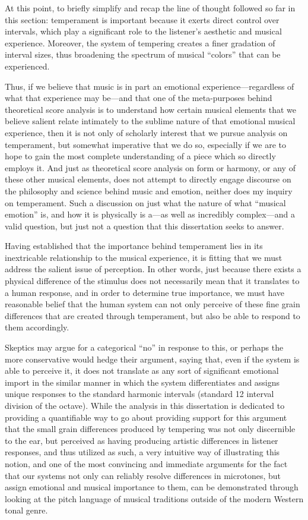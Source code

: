 At this point, to briefly simplify and recap the line of thought
followed so far in this section: temperament is important because it
exerts direct control over intervals, which play a significant role to
the listener's aesthetic and musical experience. Moreover, the system of
tempering creates a finer gradation of interval sizes, thus broadening
the spectrum of musical ``colors'' that can be experienced.

Thus, if we believe that music is in part an emotional
experience---regardless of what that experience may be---and that one of
the meta-purposes behind theoretical score analysis is to understand how
certain musical elements that we believe salient relate intimately to
the sublime nature of that emotional musical experience, then it is not
only of scholarly interest that we pursue analysis on temperament, but
somewhat imperative that we do so, especially if we are to hope to gain
the most complete understanding of a piece which so directly employs it.
And just as theoretical score analysis on form or harmony, or any of
these other musical elements, does not attempt to directly engage
discourse on the philosophy and science behind music and emotion,
neither does my inquiry on temperament. Such a discussion on just what
the nature of what ``musical emotion'' is, and how it is physically is
a---as well as incredibly complex---and a valid question, but just not a
question that this dissertation seeks to answer.

Having established that the importance behind temperament lies in its
inextricable relationship to the musical experience, it is fitting that
we must address the salient issue of perception. In other words, just
because there exists a physical difference of the stimulus does not
necessarily mean that it translates to a human response, and in order to
determine true importance, we must have reasonable belief that the human
system can not only perceive of these fine grain differences that are
created through temperament, but also be able to respond to them
accordingly.

Skeptics may argue for a categorical ``no'' in response to this, or
perhaps the more conservative would hedge their argument, saying that,
even if the system is able to perceive it, it does not translate as any
sort of significant emotional import in the similar manner in which the
system differentiates and assigns unique responses to the standard
harmonic intervals (standard 12 interval division of the octave). While
the analysis in this dissertation is dedicated to providing a
quantifiable way to go about providing support for this argument that
the small grain differences produced by tempering was not only
discernible to the ear, but perceived as having producing artistic
differences in listener responses, and thus utilized as such, a very
intuitive way of illustrating this notion, and one of the most
convincing and immediate arguments for the fact that our systems not
only can reliably resolve differences in microtones, but assign
emotional and musical importance to them, can be demonstrated through
looking at the pitch language of musical traditions outside of the
modern Western tonal genre.

